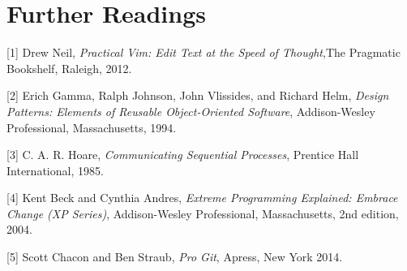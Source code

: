 \cleardoublepage
{}
\chapter*{Further Readings}


[1] Drew Neil, \textit{Practical Vim: Edit Text at the Speed of
Thought},The Pragmatic Bookshelf, Raleigh, 2012.

[2] Erich Gamma, Ralph Johnson, John Vlissides, and Richard
Helm, \textit{Design Patterns: Elements of Reusable Object-Oriented
Software}, Addison-Wesley Professional, Massachusetts, 1994.

[3] C. A. R. Hoare, \textit{Communicating Sequential Processes},
Prentice Hall International, 1985.

[4] Kent Beck and Cynthia Andres, \textit{Extreme Programming
Explained: Embrace Change (XP Series)}, Addison-Wesley Professional,
Massachusetts, 2nd edition, 2004.

[5] Scott Chacon and Ben Straub, \textit{Pro Git}, Apress, New York
2014.
